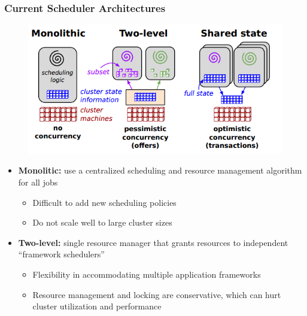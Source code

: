 \begin{frame}\frametitle{Current Scheduler Architectures}
\begin{figure}[h]
  \centering
  \includegraphics[scale=0.3]{./figures/intro_arch}
  \label{fig:intro_arch}
\end{figure}
\begin{itemize}
	\item {\bf Monolitic:} use a centralized scheduling and resource management algorithm for all jobs
	\begin{itemize}
		\item Difficult to add new scheduling policies
		\item Do not scale well to large cluster sizes
	\end{itemize}
	
\vspace{10pt}

	\item {\bf Two-level:} single resource manager that grants resources to independent ``framework schedulers''
	\begin{itemize}
		\item Flexibility in accommodating multiple application frameworks
		\item Resource management and locking are conservative, which can hurt cluster utilization and performance
	\end{itemize}
\end{itemize}
\end{frame}

